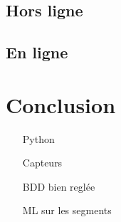 \documentclass{beamer}
\begin{document}
\subsection{Hors ligne}

\begin{frame}

\end{frame}

\subsection{En ligne}

\section{Conclusion}

\begin{frame}

\begin{itemize}

	\item[Python]
	
	\item[Capteurs]
	
	\item[BDD] bien reglée
	
	\item[ML] sur les segments

\end{itemize}

\end{frame}
\end{document}

